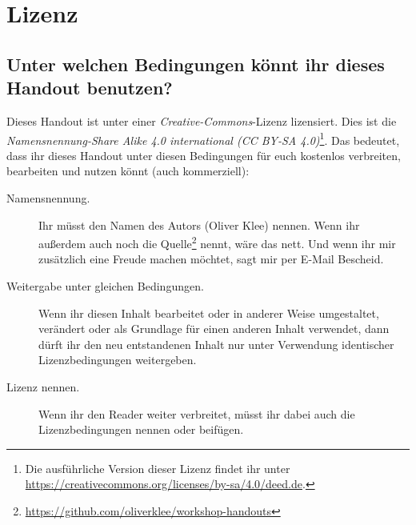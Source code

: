 \chapter{Lizenz}

\section*{Unter welchen Bedingungen könnt ihr dieses Handout benutzen?}
Dieses Handout ist unter einer \emph{Creative-Commons}-Lizenz lizensiert. Dies ist die \emph{Namensnennung-Share Alike 4.0 international (CC BY-SA 4.0)}\footnote{Die ausführliche Version dieser Lizenz findet ihr unter \url{https://creativecommons.org/licenses/by-sa/4.0/deed.de}.}. Das bedeutet, dass ihr dieses Handout unter diesen Bedingungen für euch kostenlos verbreiten, bearbeiten und nutzen könnt (auch kommerziell):

\begin{description}
  \item[Namensnennung.] Ihr müsst den Namen des Autors (Oliver Klee) nennen. Wenn ihr außerdem auch noch die Quelle\footnote{\url{https://github.com/oliverklee/workshop-handouts}} nennt, wäre das nett. Und wenn ihr mir zusätzlich eine Freude machen möchtet, sagt mir per E-Mail Bescheid.
  \item[Weitergabe unter gleichen Bedingungen.] Wenn ihr diesen Inhalt bearbeitet oder in anderer Weise umgestaltet, verändert oder als Grundlage für einen anderen Inhalt verwendet, dann dürft ihr den neu entstandenen Inhalt nur unter Verwendung identischer Lizenzbedingungen weitergeben.
  \item[Lizenz nennen.] Wenn ihr den Reader weiter verbreitet, müsst ihr dabei auch die Lizenzbedingungen nennen oder beifügen.
\end{description}
